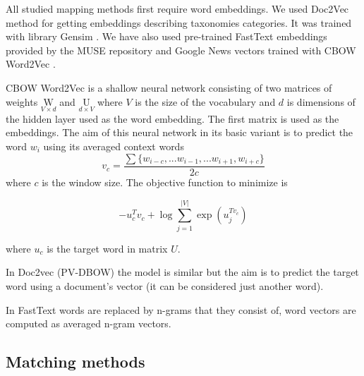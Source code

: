 \documentclass[11pt,a4paper]{article}
\begin{document}
All studied mapping methods first require word embeddings. We used Doc2Vec \cite{doc2vec} method for getting embeddings describing taxonomies categories. It was trained with library Gensim \cite{gensim}. We have also used pre-trained FastText \cite{fasttext} embeddings provided by the MUSE repository and Google News vectors trained with CBOW Word2Vec \cite{mikolov2013}. 

CBOW Word2Vec is a shallow neural network consisting of two matrices of weights $\underset{V\times d}{\mathrm{W}}$ and $\underset{d\times V}{\mathrm{U}}$ where $V$ is the size of the vocabulary and $d$ is dimensions of the hidden layer used as the word embedding.
The first matrix is used as the embeddings.
The aim of this neural network in its basic variant is to predict the word $w_i$ using its averaged context words
$$v_c = \dfrac{\sum\{w_{i-c},...w_{i-1},...w_{i+1}, w_{i+c}\}}{2c}$$
where $c$ is the window size. The objective function to minimize is

$$ -u_c^Tv_c + \log \sum_{j=1}^{|V|}\exp(u_j^{Tv_c})$$

where $u_c$ is the target word in matrix $U$.

In Doc2vec (PV-DBOW) the model is similar but the aim is to predict the target word using a document's vector (it can be considered just another word).

In FastText words are replaced by n-grams that they consist of, word vectors are computed as averaged n-gram vectors.

\subsection{Matching methods}
\end{document}
